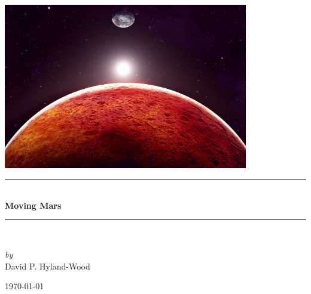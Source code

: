 \documentclass[12pt]{book} %
\newcommand{\HRule}{\rule{\linewidth}{0.5mm}}
\begin{document}
\begin{titlepage}
\begin{center}

\includegraphics[width=0.80\textwidth, frame]{cover/MovingMarsfront_top}~\\[1cm]

\HRule \\[0.4cm]
{ \Huge \bfseries Moving Mars \\[0.4cm] }
\HRule \\[1.5cm]

\noindent
\begin{minipage}{0.4\textwidth}
\begin{center} \large
\emph{by}\\
David P. Hyland-Wood
\end{center}
\end{minipage}%

\vfill

{\large \today}

\end{center}
\end{titlepage}

\pagestyle{fancy}
\fancyhf{}
\lhead[]{\thepage}
\rhead[\thepage]{}
\doublespacing

\frontmatter
\end{document}
